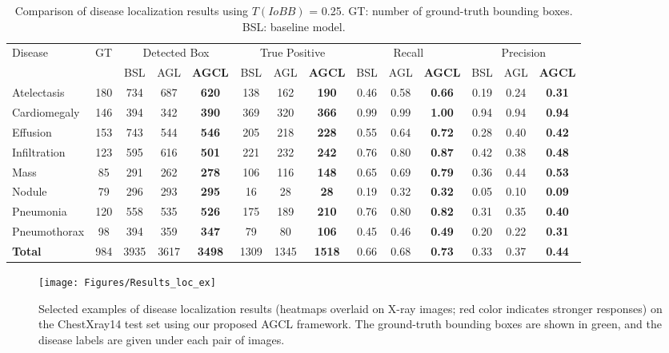 \documentclass[runningheads,a4paper]{llncs}
\begin{document}
\begin{table*}[t!] \fontsize{8.5pt}{8.5pt}\selectfont
\renewcommand{\arraystretch}{1.2}
\caption{Comparison of disease localization results using $T(IoBB)$ = 0.25. GT: number of ground-truth bounding boxes. BSL: baseline model.}
\label{table-results-loc}
\centering
\begin{tabular}{@{}l|c|c c c|c c c|c c c|c c c}
  \hline
  Disease &GT &\multicolumn{3}{c|}{Detected Box} &\multicolumn{3}{c|}{True Positive} &\multicolumn{3}{c|}{Recall} & \multicolumn{3}{c}{Precision} \\
  & &\tiny{BSL} &\tiny{AGL} &\tiny{\textbf{AGCL}} &\tiny{BSL} &\tiny{AGL} &\tiny{\textbf{AGCL}} &\tiny{BSL} &\tiny{AGL} &\tiny{\textbf{AGCL}} &\tiny{BSL} &\tiny{AGL} &\tiny{\textbf{AGCL}}\\
  \hline
  Atelectasis &180 &734 &687 &\textbf{620} &138 &162&\textbf{190} &0.46 &0.58 &\textbf{0.66} &0.19 &0.24 &\textbf{0.31} \\ \hline
  Cardiomegaly &146 &394 &342 &\textbf{390} &369 &320 &\textbf{366} &0.99 &0.99 &\textbf{1.00} &0.94 &0.94 &\textbf{0.94} \\ \hline
  Effusion &153 &743 &544 &\textbf{546} &205 &218 &\textbf{228} &0.55 &0.64 &\textbf{0.72} &0.28 &0.40 &\textbf{0.42}\\ \hline
  Infiltration &123 &595 &616 &\textbf{501} &221 &232 &\textbf{242} &0.76 &0.80 &\textbf{0.87} &0.42 &0.38 &\textbf{0.48}\\ \hline
  Mass &85 &291 &262 &\textbf{278} &106 &116 &\textbf{148} &0.65 &0.69 &\textbf{0.79} &0.36 &0.44 &\textbf{0.53}\\ \hline 
  Nodule &79 &296 &293&\textbf{295} &16 &28 &\textbf{28} &0.19 &0.32 &\textbf{0.32} &0.05 &0.10 &\textbf{0.09}\\ \hline 
  Pneumonia &120 &558 &535 &\textbf{526} &175 &189 &\textbf{210} &0.76 &0.80 &\textbf{0.82} &0.31 &0.35 &\textbf{0.40}\\ \hline 
  Pneumothorax &98 &394 &359 &\textbf{347} &79 &80 &\textbf{106} &0.45 &0.46 &\textbf{0.49} &0.20 &0.22 &\textbf{0.31}\\ \hline 
  \textbf{Total} &984 &3935 & 3617 &\textbf{3498} &1309 &1345 &\textbf{1518} &0.66 &0.68 &\textbf{0.73} &0.33 &0.37 &\textbf{0.44}\\ \hline
\end{tabular}
\end{table*}
\begin{figure*}[t!]
  \centering
  \texttt{[image: Figures/Results\_loc\_ex]}
  \caption{Selected examples of disease localization results (heatmaps overlaid on X-ray images; red color indicates stronger responses) on the ChestXray14 test set using our proposed AGCL framework. The ground-truth bounding boxes are shown in green, and the disease labels are given under each pair of images. }
  \label{fig:results-loc}
\end{figure*}
\end{document}
